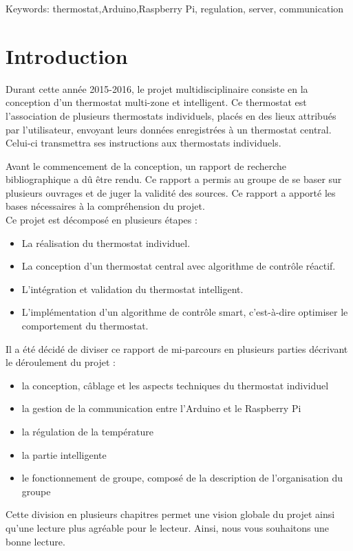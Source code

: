 \documentclass[12pt]{report}
\begin{document}
Keywords: thermostat,Arduino,Raspberry Pi, regulation, server, communication



\chapter{Introduction}

Durant cette ann\'{e}e 2015-2016, le projet multidisciplinaire consiste en la conception d’un thermostat multi-zone et intelligent. Ce thermostat est l’association de plusieurs thermostats individuels, plac\'{e}s en des lieux attribu\'{e}s par l'utilisateur, envoyant leurs donn\'{e}es enregistr\'{e}es \`{a} un thermostat central. Celui-ci transmettra ses instructions aux thermostats individuels.

\noindent
Avant le commencement de la conception, un rapport de recherche bibliographique a dû être rendu. Ce rapport a permis au groupe de se baser sur plusieurs ouvrages et de juger la validit\'{e} des sources. Ce rapport a apporté les bases nécessaires à la compréhension du projet.\\

\noindent
Ce projet est décompos\'{e} en plusieurs \'{e}tapes :
\begin{itemize}
\item La r\'{e}alisation du thermostat individuel.
\item La conception d’un thermostat central avec algorithme de contr\^{o}le r\'{e}actif.
\item L’int\'{e}gration et validation du thermostat intelligent.
\item L'implémentation d’un algorithme de contr\^{o}le smart, c’est-\`{a}-dire optimiser le comportement du thermostat.
\end{itemize}
\vspace{0.45 cm}
\noindent
Il a \'{e}t\'{e} d\'{e}cid\'{e} de diviser ce rapport de mi-parcours en plusieurs parties d\'{e}crivant le d\'{e}roulement du projet :
\begin{itemize}
\item la conception, câblage et les aspects techniques du thermostat individuel
\item la gestion de la communication entre l’Arduino et le Raspberry Pi
\item la r\'{e}gulation de la temp\'{e}rature
\item la partie intelligente
\item le fonctionnement de groupe, compos\'{e} de la description de l’organisation du groupe
\end{itemize}
\vspace{0.45 cm}
Cette division en plusieurs chapitres permet une vision globale du projet ainsi qu'une lecture plus agr\'{e}able pour le lecteur. Ainsi, nous vous souhaitons une bonne lecture.
\end{document}
